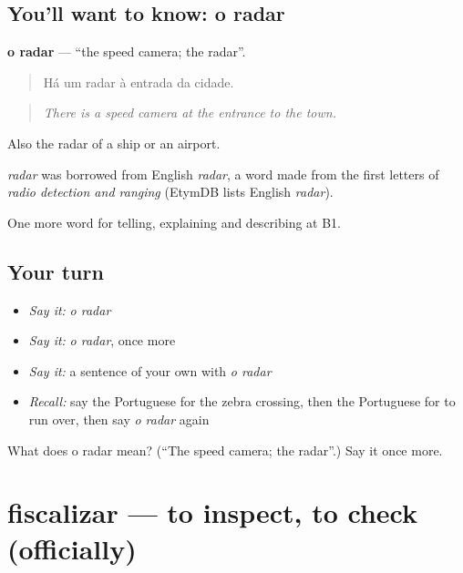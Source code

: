 \subsection*{You'll want to know: o radar}
\textbf{o radar} — \textquotedblleft{}the speed camera; the radar\textquotedblright{}.

\begin{quote}
Há um radar à entrada da cidade.
\end{quote}

\begin{quote}
\emph{There is a speed camera at the entrance to the town.}
\end{quote}

Also the radar of a ship or an airport.

\begin{cousinweb}
\emph{radar} was borrowed from English \emph{radar}, a word made from the first letters of \emph{radio detection and ranging} (EtymDB lists English \emph{radar}).
\end{cousinweb}

\begin{grammarlens}[title={What you've built}]
One more word for telling, explaining and describing at B1.
\end{grammarlens}

\subsection*{Your turn}
\begin{itemize}
\raggedright
  \item \emph{Say it:} \emph{o radar}
  \item \emph{Say it:} \emph{o radar}, once more
  \item \emph{Say it:} a sentence of your own with \emph{o radar}
  \item \emph{Recall:} say the Portuguese for the zebra crossing, then the Portuguese for to run over, then say \emph{o radar} again
\end{itemize}

\begin{tcolorbox}[breakable,colback=teal!4,colframe=teal!35!black,title={Before you move on}]
What does o radar mean? (\textquotedblleft{}The speed camera; the radar\textquotedblright{}.) Say it once more.
\end{tcolorbox}
\section[fiscalizar]{fiscalizar — to inspect, to check (officially)}

